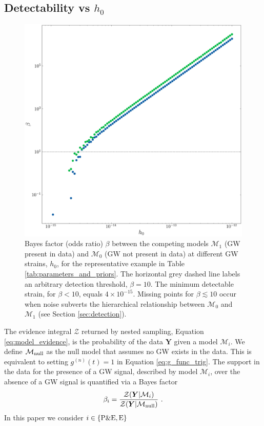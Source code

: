 \documentclass[fleqn,usenatbib,useAMS]{mnras}
\begin{document}
\subsection{Detectability vs $h_0$}\label{sec:psr_v_earth_bayes}
		
		\begin{figure}
			\includegraphics[width=\columnwidth, height = \columnwidth ]{images/CanonicalBayesPlot2000} 	
			\caption{Bayes factor (odds ratio) $\beta$ between the competing models $\mathcal{M}_1$ (GW present in data) and $\mathcal{M}_0$ (GW not present in data) at different GW strains, $h_0$, for the representative example in Table \ref{tab:parameters_and_priors}. The horizontal grey dashed line labels an arbitrary detection threshold, $\beta = 10$. The minimum detectable strain, for $\beta < 10$, equals $4 \times 10^{-15}$. Missing points for $\beta \lesssim 10$ occur when noise subverts the hierarchical relationship between $\mathcal{M}_0$ and $\mathcal{M}_1$ (see Section \ref{sec:detection}).}
			\label{fig:bayes1}
		\end{figure}
The evidence integral $\mathcal{Z}$ returned by nested sampling, Equation \eqref{eq:model_evidence}, is the probability of the data $\boldsymbol{Y}$ given a model $\mathcal{M}_i$. We define $\mathcal{M}_{\rm null}$ as the null model that assumes no GW exists in the data. This is equivalent to setting $g^{(n)}(t)=1$ in Equation \eqref{eq:g_func_trig}. The support in the data for the presence of a GW signal, described by model $\mathcal{M}_i$, over the absence of a GW signal is quantified via a Bayes factor
		\begin{equation}
			\beta_i = \frac{\mathcal{Z}(\boldsymbol{Y} | \mathcal{M}_i)}{\mathcal{Z}(\boldsymbol{Y} | \mathcal{M}_{\rm null})} \ . \label{eq:bayes}
		\end{equation}
In this paper we consider $i \in \left \{ \rm P\& E, E\right \}$ \newline 
	
\end{document}
